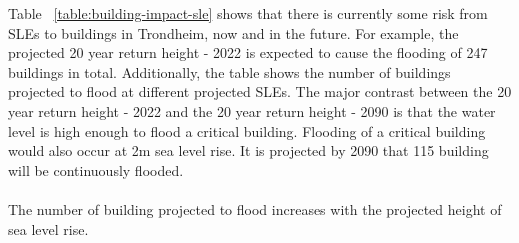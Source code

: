 Table ~\ref{table:building-impact-sle} shows that there is currently some risk from SLEs to buildings in Trondheim, now and in the future. For example, the projected 20 year return height - 2022 is expected to cause the flooding of 247 buildings in total. Additionally, the table shows the number of buildings projected to flood at different projected SLEs. The major contrast between the 20 year return height - 2022 and the 20 year return height - 2090 is that the water level is high enough to flood a critical building. Flooding of a critical building would also occur at 2m sea level rise. It is projected by 2090 that 115 building will be continuously flooded.
\paragraph{}
The number of building projected to flood increases with the projected height of sea level rise. 
